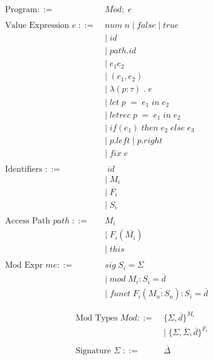 \documentclass[10pt,a4paper,draft]{article}
\begin{document}
\begin{flushleft}
\begin{figure}[!htbp]
\begin{align*}
\begin{aligned}
\text{Program} ::= \; & \overline{\mathit{Mod}};\;e\\
\\
\text{Value Expression }e \; ::= \; &\mathit{num \; n \;} | \; \mathit{false} \; | \; \mathit{true} \\
&|\;\mathit{id}  \\
&|\;\mathit{path.id} \\
&|\;e_{1}e_{2} \\
&|\;(e_{1},e_{2}) \\
&|\;\lambda(p:\tau)\;.\;e \\
&|\;\mathit{let }\; p \; = \; e_{1} \; in \; e_{2} \\
&|\;\mathit{letrec} \; p \; = \; e_{1} \; in \; e_{2} \\
&|\; \mathit{if(e_{1}) \; then \; e_{2} \; else \; e_{3}}\\
&|\;\mathit{p.left}\; | \; \mathit{p.right} \\
&|\;\mathit{fix\;e} \\
\\
\text{Identifiers } ::= \; & \; id \\ 
&|\;M_{i}\\
&|\;F_{i}\\
&|\;S_{i}\\
\\
\text{Access Path } \mathit{path} \; ::= \; &\mathit{M_{i}}\\
&|\;F_{i}(\overline{\mathit{M_{i}}})\\
&|\;\mathit{this}\\
\\
\text{Mod Expr } \mathit{me} ::= \; & \mathit{sig} \; S_{i} = \Sigma\\
&|\; \mathit{mod} \;  M_{i} : S_{i} = \overline{\mathit{d}} \\
&|\; \mathit{funct} \; F_{i} (\overline{M_{n}:S_{n}}):S_{i} = \overline{d}\\
\\
\end{aligned}
\begin{aligned}
\text{Mod Types } \mathit{Mod} ::=\;&\lbrace \Sigma, \overline{\mathit{d}} \rbrace^{M_{i}} \\
&|\; \lbrace \Sigma, \overline{\Sigma}, \overline{d} \rbrace^{F_{i}} \\
\\
\text{Signature } \Sigma \; ::=\; & \overline{\Delta}\\

\end{aligned}
\end{align*}
\end{figure}
\end{flushleft}
\end{document}
